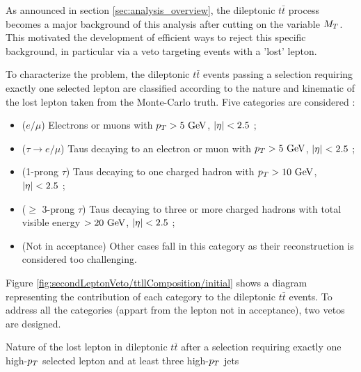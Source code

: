     As announced in section \ref{sec:analysis_overview}, the dileptonic $t\bar{t}$ 
    process becomes a major background of this analysis after cutting on the variable $M_T$.
    This motivated the development of efficient ways to reject this specific background, 
    in particular via a veto targeting events with a 'lost' lepton.

    To characterize the problem, the dileptonic $t\bar{t}$ events passing a selection
    requiring exactly one selected lepton are classified according to the nature and 
    kinematic of the lost lepton taken from the Monte-Carlo truth. Five categories are considered :
    \begin{itemize}
        \item ($e/\mu$) Electrons or muons with $p_T > 5~\text{GeV}$, $\left| \eta \right| < 2.5$ ;
        \item ($\tau \rightarrow e/\mu$) Taus decaying to an electron or muon with $p_T > 5~\text{GeV}$, $\left| \eta \right| < 2.5$ ;
        \item (1-prong $\tau$) Taus decaying to one charged hadron with $p_T > 10~\text{GeV}$, $\left| \eta \right| < 2.5$ ;
        \item ($\geq$ 3-prong $\tau$) Taus decaying to three or more charged hadrons 
              with total visible energy $> 20~\text{GeV}$, $\left| \eta \right| < 2.5$ ;
        \item (Not in acceptance) Other cases fall in this category as their reconstruction 
              is considered too challenging.
    \end{itemize}

    Figure \ref{fig:secondLeptonVeto/ttllComposition/initial} shows a diagram representing 
    the contribution of each category to the dileptonic $t\bar{t}$ events. To address all
    the categories (appart from the lepton not in acceptance), two vetos are designed.

                 {Nature of the lost lepton in dileptonic $t\bar{t}$ after a selection 
                 requiring exactly one high-$p_T$ selected lepton and at least three 
                 high-$p_T$ jets}


